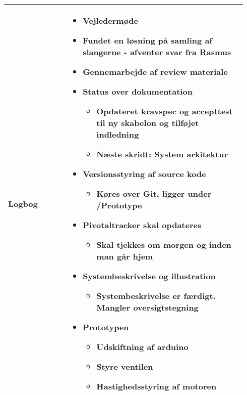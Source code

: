 \begin{longtable}{|p{0.24\linewidth}|p{0.7\linewidth}|}
		\\ \hline
		Logbog & 
		\begin{itemize}
			\item Vejledermøde 
			\item Fundet en løsning på samling af slangerne - afventer svar fra Rasmus
			\item Gennemarbejde af review materiale 
			\item Status over dokumentation
			\begin{itemize}
				\item Opdateret kravspec og accepttest til ny skabelon og tilføjet indledning
				\item Næste skridt: System arkitektur
			\end{itemize}
			\item Versionsstyring af source kode
			\begin{itemize}
				\item Køres over Git, ligger under /Prototype
			\end{itemize}
			\item Pivotaltracker skal opdateres
			\begin{itemize}
				\item Skal tjekkes om morgen og inden man går hjem
			\end{itemize}
			\item Systembeskrivelse og illustration 
			\begin{itemize}
				\item Systembeskrivelse er færdigt. Mangler oversigtstegning
			\end{itemize}
			\item Prototypen 
			\begin{itemize}
				\item Udskiftning af arduino 
				\item Styre ventilen
				\item Hastighedsstyring af motoren
			\end{itemize}
		\end{itemize}
		\\ \hline
	\end{longtable}
	
